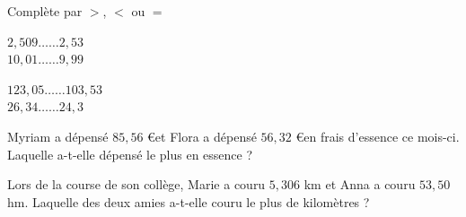 \begin{pageAD}

Complète par $>$, $<$ ou $=$ 
 
\vspace{0.4cm}
\begin{minipage}{0.5\linewidth}

$2,509 \ldots\ldots 2,53$\\
$10,01 \ldots\ldots 9,99$


\end{minipage}
\begin{minipage}{0.5\linewidth}

 $123,05 \ldots\ldots 103,53$\\
 $26,34 \ldots\ldots 24,3$
 

\end{minipage}



Myriam a dépensé $85,56$ \euro et Flora a dépensé $56,32$ \euro en frais d'essence ce mois-ci. Laquelle a-t-elle dépensé le plus en essence ?



Lors de la course de son collège, Marie a couru $5,306$ km et Anna a couru $53,50$ hm. Laquelle des deux amies a-t-elle couru le plus de kilomètres ?





\end{pageAD} 

